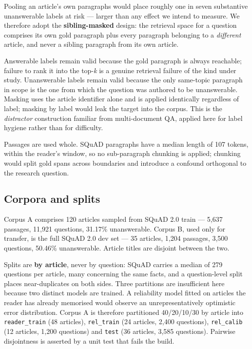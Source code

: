 \documentclass[conference]{IEEEtran}
\begin{document}
Pooling an article's own paragraphs would place roughly one in seven substantive unanswerable labels at risk --- larger than any effect we intend to measure. We therefore adopt the \textbf{sibling-masked} design: the retrieval space for a question comprises its own gold paragraph plus every paragraph belonging to a \emph{different} article, and never a sibling paragraph from its own article.

Answerable labels remain valid because the gold paragraph is always reachable; failure to rank it into the top-\emph{k} is a genuine retrieval failure of the kind under study. Unanswerable labels remain valid because the only same-topic paragraph in scope is the one from which the question was authored to be unanswerable. Masking uses the article identifier alone and is applied identically regardless of label; masking by label would leak the target into the corpus. This is the \emph{distractor} construction familiar from multi-document QA, applied here for label hygiene rather than for difficulty.

Passages are used whole. SQuAD paragraphs have a median length of 107 tokens, within the reader's window, so no sub-paragraph chunking is applied; chunking would split gold spans across boundaries and introduce a confound orthogonal to the research question.

\subsection{Corpora and splits}

Corpus A comprises 120 articles sampled from SQuAD 2.0 train --- 5,637 passages, 11,921 questions, 31.17\% unanswerable. Corpus B, used only for transfer, is the full SQuAD 2.0 dev set --- 35 articles, 1,204 passages, 3,500 questions, 50.46\% unanswerable. Article titles are disjoint between the two.

Splits are \textbf{by article}, never by question: SQuAD carries a median of 279 questions per article, many concerning the same facts, and a question-level split places near-duplicates on both sides. Three partitions are insufficient here because two distinct models are trained. A reliability model fitted on articles the reader has already memorised would observe an unrepresentatively optimistic error distribution. Corpus A is therefore partitioned 40/20/10/30 by article into \texttt{reader\_train} (48 articles), \texttt{rel\_train} (24 articles, 2,400 questions), \texttt{rel\_calib} (12 articles, 1,200 questions) and \texttt{test} (36 articles, 3,585 questions). Pairwise disjointness is asserted by a unit test that fails the build.
\end{document}
